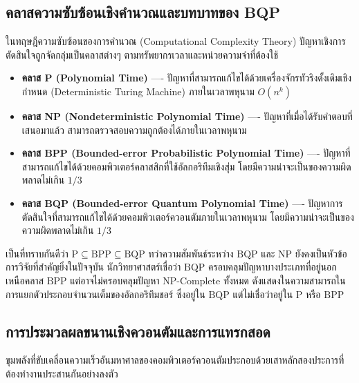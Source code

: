 \subsection{คลาสความซับซ้อนเชิงคำนวณและบทบาทของ BQP}
ในทฤษฎีความซับซ้อนของการคำนวณ (Computational Complexity Theory) ปัญหาเชิงการตัดสินใจถูกจัดกลุ่มเป็นคลาสต่างๆ ตามทรัพยากรเวลาและหน่วยความจำที่ต้องใช้
\begin{itemize}
    \item \textbf{คลาส P (Polynomial Time)} ---- ปัญหาที่สามารถแก้ไขได้ด้วยเครื่องจักรทัวริงดั้งเดิมเชิงกำหนด (Deterministic Turing Machine) ภายในเวลาพหุนาม $O(n^k)$
    \item \textbf{คลาส NP (Nondeterministic Polynomial Time)} ---- ปัญหาที่เมื่อได้รับคำตอบที่เสนอมาแล้ว สามารถตรวจสอบความถูกต้องได้ภายในเวลาพหุนาม
    \item \textbf{คลาส BPP (Bounded-error Probabilistic Polynomial Time)} ---- ปัญหาที่สามารถแก้ไขได้ด้วยคอมพิวเตอร์คลาสสิกที่ใช้อัลกอริทึมเชิงสุ่ม โดยมีความน่าจะเป็นของความผิดพลาดไม่เกิน $1/3$
    \item \textbf{คลาส BQP (Bounded-error Quantum Polynomial Time)} ---- ปัญหาการตัดสินใจที่สามารถแก้ไขได้ด้วยคอมพิวเตอร์ควอนตัมภายในเวลาพหุนาม โดยมีความน่าจะเป็นของความผิดพลาดไม่เกิน $1/3$
\end{itemize}

เป็นที่ทราบกันดีว่า $\text{P} \subseteq \text{BPP} \subseteq \text{BQP}$ ทว่าความสัมพันธ์ระหว่าง $\text{BQP}$ และ $\text{NP}$ ยังคงเป็นหัวข้อการวิจัยที่สำคัญยิ่งในปัจจุบัน นักวิทยาศาสตร์เชื่อว่า $\text{BQP}$ ครอบคลุมปัญหาบางประเภทที่อยู่นอกเหนือคลาส $\text{BPP}$ แต่อาจไม่ครอบคลุมปัญหา $\text{NP-Complete}$ ทั้งหมด ดังแสดงในความสามารถในการแยกตัวประกอบจำนวนเต็มของอัลกอริทึมชอร์ ซึ่งอยู่ใน $\text{BQP}$ แต่ไม่เชื่อว่าอยู่ใน $\text{P}$ หรือ $\text{BPP}$

\subsection{การประมวลผลขนานเชิงควอนตัมและการแทรกสอด}
ขุมพลังที่ขับเคลื่อนความเร็วอันมหาศาลของคอมพิวเตอร์ควอนตัมประกอบด้วยเสาหลักสองประการที่ต้องทำงานประสานกันอย่างลงตัว

